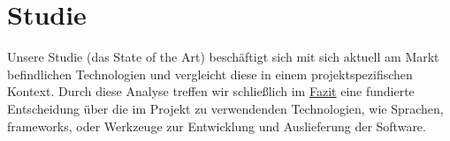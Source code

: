 \chapter{Studie}

Unsere Studie (das State of the Art) beschäftigt sich mit sich aktuell am Markt befindlichen Technologien und vergleicht diese in einem projektspezifischen Kontext. Durch diese Analyse treffen wir schließlich im \hyperref[sec:fazit]{Fazit} eine fundierte Entscheidung über die im Projekt zu verwendenden Technologien, wie Sprachen, \gls{framework}s, oder Werkzeuge zur Entwicklung und Auslieferung der Software.